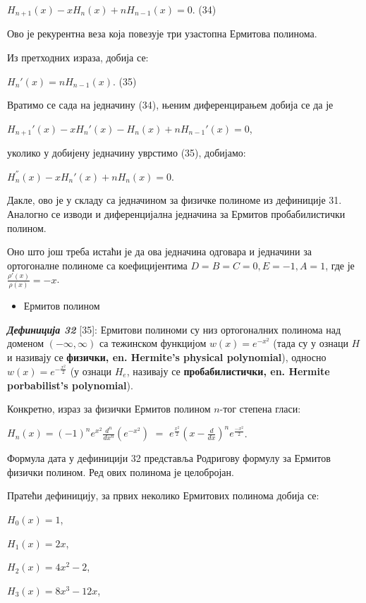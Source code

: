 \(H_{n + 1}(x) - xH_{n}(x) + nH_{n - 1}(x) = 0\). (34)

Ово је рекурентна веза која повезује три узастопна Ермитова полинома.

Из претходних израза, добија се:

\(H_{n}'(x) = nH_{n - 1}(x)\). (35)

Вратимо се сада на једначину (34), њеним диференцирањем добија се да је

\(H_{n + 1}'(x) - xH_{n}'(x) - H_{n}(x) + nH_{n - 1}'(x) = 0\),

уколико у добијену једначину уврстимо (35), добијамо:

\(H_{n}^{''}(x) - xH_{n}'(x) + nH_{n}(x) = 0\).

Дакле, ово је у складу са једначином за физичке полиноме из дефиниције
31. Аналогно се изводи и диференцијална једначина за Ермитов
пробабилистички полином.

Оно што још треба истаћи је да ова једначина одговара и једначини за
ортогоналне полиноме са коефицијентима \(D = B = C = 0,E = - 1,A = 1\),
где је \(\frac{\rho'(x)}{\rho(x)} = - x\).

\begin{itemize}
\item
  Ермитов полином
\end{itemize}

\emph{\textbf{Дефиниција 32}} {[}35{]}: Ермитови полиноми су низ
ортогоналних полинома над доменом \(( - \infty,\infty)\) са тежинском
функцијом \(w(x) = e^{- x^{2}}\) (тада су у ознаци \(H\) и називају се
\textbf{физички, en. Hermite's physical polynomial}), односно
\(w(x) = e^{- \frac{x^{2}}{2}}\) (у ознаци \(H_{e}\), називају се
\textbf{пробабилистички, en. Hermite porbabilist's polynomial}).

Конкретно, израз за физички Ермитов полином \(n\)-тог степена гласи:

\(H_{n}(x) = {( - 1)}^{n}e^{x^{2}}\frac{d^{n}}{dx^{n}}(e^{- x^{2}})\)
\(=\)
\(e^{\frac{x^{2}}{2}}{(x - \frac{d}{dx})}^{n}e^{\frac{- x^{2}}{2}}\).

Формула дата у дефиницији 32 представља Родригову формулу за Ермитов
физички полином. Ред ових полинома је целобројан.

Пратећи дефиницију, за првих неколико Ермитових полинома добија се:

\(H_{0}(x) = 1\),

\(H_{1}(x) = 2x\),

\(H_{2}(x) = 4x^{2} - 2\),

\(H_{3}(x) = 8x^{3} - 12x\),

